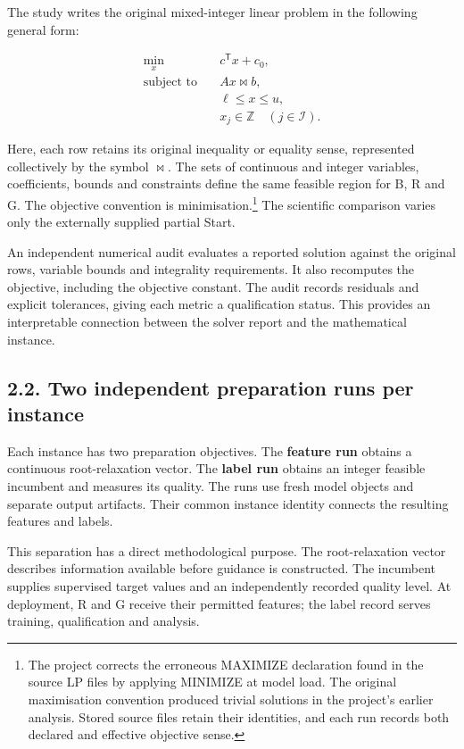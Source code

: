 \documentclass[
  british,
  10pt,
]{article}
\begin{document}
The study writes the original mixed-integer linear problem in the
following general form:

\[
\begin{aligned}
\min_{x}\quad & c^{\mathsf T}x+c_0,\\
\text{subject to}\quad & A x\mathrel{\bowtie}b,\\
& \ell\le x\le u,\\
& x_j\in\mathbb Z\quad (j\in\mathcal I).
\end{aligned}
\tag{1}
\]

Here, each row retains its original inequality or equality sense,
represented collectively by the symbol \(\bowtie\). The sets of
continuous and integer variables, coefficients, bounds and constraints
define the same feasible region for B, R and G. The objective convention
is minimisation.\footnote{The project corrects the erroneous MAXIMIZE
  declaration found in the source LP files by applying MINIMIZE at model
  load. The original maximisation convention produced trivial solutions
  in the project's earlier analysis. Stored source files retain their
  identities, and each run records both declared and effective objective
  sense.} The scientific comparison varies only the externally supplied
partial Start.

An independent numerical audit evaluates a reported solution against the
original rows, variable bounds and integrality requirements. It also
recomputes the objective, including the objective constant. The audit
records residuals and explicit tolerances, giving each metric a
qualification status. This provides an interpretable connection between
the solver report and the mathematical instance.

\subsection{2.2. Two independent preparation runs per
instance}\label{two-independent-preparation-runs-per-instance}

Each instance has two preparation objectives. The \textbf{feature run}
obtains a continuous root-relaxation vector. The \textbf{label run}
obtains an integer feasible incumbent and measures its quality. The runs
use fresh model objects and separate output artifacts. Their common
instance identity connects the resulting features and labels.

This separation has a direct methodological purpose. The root-relaxation
vector describes information available before guidance is constructed.
The incumbent supplies supervised target values and an independently
recorded quality level. At deployment, R and G receive their permitted
features; the label record serves training, qualification and analysis.
\end{document}
